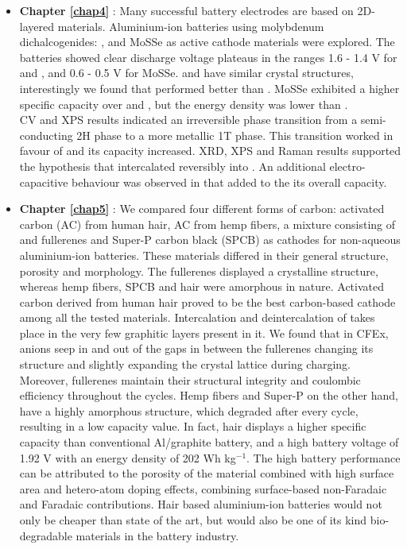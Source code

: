 \begin{itemize}

\item \textbf{Chapter \ref{chap4}} : Many successful battery electrodes are based on 2D-layered materials. Aluminium-ion batteries using molybdenum dichalcogenides: ,  and MoSSe as active cathode materials were explored. The batteries showed clear discharge voltage plateaus in the ranges 1.6 - 1.4 V for  and , and 0.6 - 0.5 V for MoSSe.  and  have similar crystal structures, interestingly we found that  performed better than . MoSSe exhibited a higher specific capacity over  and , but the energy density was lower than .  \\
CV and XPS results indicated an irreversible phase transition from a semi-conducting 2H phase to a more metallic 1T phase. This transition worked in favour of  and its capacity increased. XRD, XPS and Raman results supported the hypothesis that  intercalated reversibly into . An additional electro-capacitive behaviour was observed in  that added to the its overall capacity.

\item \textbf{Chapter \ref{chap5}} : We compared four different forms of carbon: activated carbon (AC) from human hair, AC from hemp fibers, a mixture consisting of  and  fullerenes and Super-P carbon black (SPCB) as cathodes for non-aqueous aluminium-ion batteries. These materials differed in their general structure, porosity and morphology. The fullerenes displayed a crystalline structure, whereas hemp fibers, SPCB and hair were amorphous in nature. Activated carbon derived from human hair proved to be the best carbon-based cathode among all the tested materials. Intercalation and deintercalation of  takes place in the very few graphitic layers present in it. We found that in CFEx,  anions seep in and out of the gaps in between the fullerenes changing its structure and slightly expanding the crystal lattice during charging. Moreover, fullerenes maintain their structural integrity and coulombic efficiency throughout the cycles. Hemp fibers and Super-P on the other hand, have a highly amorphous structure, which degraded after every cycle, resulting in a low capacity value. In fact, hair displays a higher specific capacity than conventional Al/graphite battery, and a high battery voltage of 1.92 V with an energy density of 202 Wh kg$^{-1}$. The high battery performance can be attributed to the porosity of the material combined with high surface area and hetero-atom doping effects, combining surface-based non-Faradaic and Faradaic contributions. Hair based aluminium-ion batteries would not only be cheaper than state of the art, but would also be one of its kind bio-degradable materials in the battery industry.


\end{itemize}
